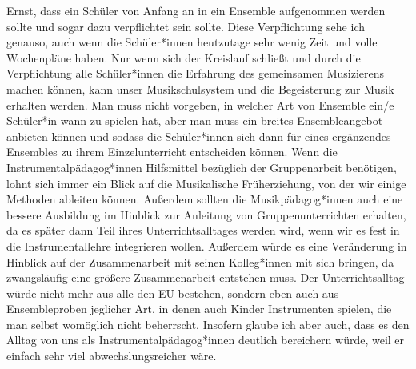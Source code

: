 Ernst, dass ein Schüler von Anfang an in ein Ensemble aufgenommen werden sollte
und sogar dazu verpflichtet sein sollte.
\autocite[61]{ernst:die_zukunftsfaehige_musikschule} Diese Verpflichtung sehe
ich genauso, auch wenn die Schüler*innen heutzutage sehr wenig Zeit und volle
Wochenpläne haben. Nur wenn sich der Kreislauf schließt und durch die
Verpflichtung alle Schüler*innen die Erfahrung des gemeinsamen Musizierens
machen können, kann unser Musikschulsystem und die Begeisterung zur Musik
erhalten werden. Man muss nicht vorgeben, in welcher Art von Ensemble ein/e
Schüler*in wann zu spielen hat, aber man muss ein breites Ensembleangebot
anbieten können und sodass die Schüler*innen sich dann für eines ergänzendes
Ensembles zu ihrem Einzelunterricht entscheiden können. Wenn die
Instrumentalpädagog*innen Hilfsmittel bezüglich der Gruppenarbeit benötigen,
lohnt sich immer ein Blick auf die Musikalische Früherziehung, von der wir
einige Methoden ableiten können. Außerdem sollten die Musikpädagog*innen auch
eine bessere Ausbildung im Hinblick zur Anleitung von Gruppenunterrichten
erhalten, da es später dann Teil ihres Unterrichtsalltages werden wird, wenn wir
es fest in die Instrumentallehre integrieren wollen. Außerdem würde es eine
Veränderung in Hinblick auf der Zusammenarbeit mit seinen Kolleg*innen mit sich
bringen, da zwangsläufig eine größere Zusammenarbeit entstehen muss. Der
Unterrichtsalltag würde nicht mehr aus alle den EU bestehen, sondern eben auch
aus Ensembleproben jeglicher Art, in denen auch Kinder Instrumenten spielen, die
man selbst womöglich nicht beherrscht. Insofern glaube ich aber auch, dass es
den Alltag von uns als Instrumentalpädagog*innen deutlich bereichern würde, weil
er einfach sehr viel abwechslungsreicher wäre. 













